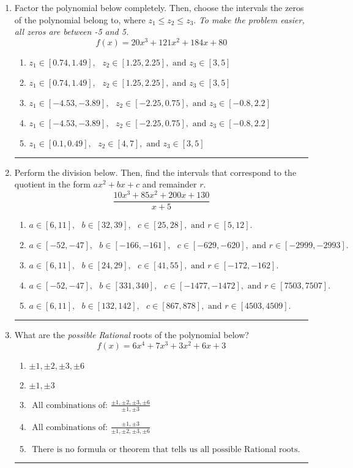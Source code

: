 \documentclass[14pt]{extbook}
\newcommand{\litem}[1]{\item#1\hspace*{-1cm}\rule{\textwidth}{0.4pt}}
\begin{document}
\begin{enumerate}
{\begin{enumerate}[label=\Alph*.]
\end{enumerate} }
\litem{
Factor the polynomial below completely. Then, choose the intervals the zeros of the polynomial belong to, where $z_1 \leq z_2 \leq z_3$. \textit{To make the problem easier, all zeros are between -5 and 5.}\[ f(x) = 20x^{3} +121 x^{2} +184 x + 80 \]\begin{enumerate}[label=\Alph*.]
\item \( z_1 \in [0.74, 1.49], \text{   }  z_2 \in [1.25, 2.25], \text{   and   } z_3 \in [3, 5] \)
\item \( z_1 \in [0.74, 1.49], \text{   }  z_2 \in [1.25, 2.25], \text{   and   } z_3 \in [3, 5] \)
\item \( z_1 \in [-4.53, -3.89], \text{   }  z_2 \in [-2.25, 0.75], \text{   and   } z_3 \in [-0.8, 2.2] \)
\item \( z_1 \in [-4.53, -3.89], \text{   }  z_2 \in [-2.25, 0.75], \text{   and   } z_3 \in [-0.8, 2.2] \)
\item \( z_1 \in [0.1, 0.49], \text{   }  z_2 \in [4, 7], \text{   and   } z_3 \in [3, 5] \)

\end{enumerate} }
\litem{
Perform the division below. Then, find the intervals that correspond to the quotient in the form $ax^2+bx+c$ and remainder $r$.\[ \frac{10x^{3} +85 x^{2} +200 x + 130}{x + 5} \]\begin{enumerate}[label=\Alph*.]
\item \( a \in [6, 11], \text{   } b \in [32, 39], \text{   } c \in [25, 28], \text{   and   } r \in [5, 12]. \)
\item \( a \in [-52, -47], \text{   } b \in [-166, -161], \text{   } c \in [-629, -620], \text{   and   } r \in [-2999, -2993]. \)
\item \( a \in [6, 11], \text{   } b \in [24, 29], \text{   } c \in [41, 55], \text{   and   } r \in [-172, -162]. \)
\item \( a \in [-52, -47], \text{   } b \in [331, 340], \text{   } c \in [-1477, -1472], \text{   and   } r \in [7503, 7507]. \)
\item \( a \in [6, 11], \text{   } b \in [132, 142], \text{   } c \in [867, 878], \text{   and   } r \in [4503, 4509]. \)

\end{enumerate} }
\litem{
What are the \textit{possible Rational} roots of the polynomial below?\[ f(x) = 6x^{4} +7 x^{3} +3 x^{2} +6 x + 3 \]\begin{enumerate}[label=\Alph*.]
\item \( \pm 1,\pm 2,\pm 3,\pm 6 \)
\item \( \pm 1,\pm 3 \)
\item \( \text{ All combinations of: }\frac{\pm 1,\pm 2,\pm 3,\pm 6}{\pm 1,\pm 3} \)
\item \( \text{ All combinations of: }\frac{\pm 1,\pm 3}{\pm 1,\pm 2,\pm 3,\pm 6} \)
\item \( \text{ There is no formula or theorem that tells us all possible Rational roots.} \)


\end{enumerate}}
\end{enumerate}
\end{document}
